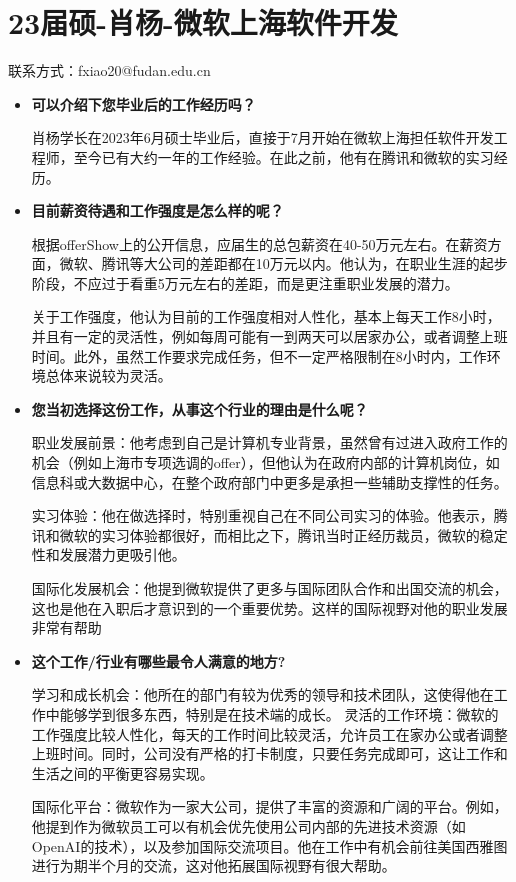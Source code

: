 \newpage
\section{23届硕-肖杨-微软上海软件开发}
联系方式：fxiao20@fudan.edu.cn
\begin{itemize}

\setlength{\parindent}{2em} 
    \item \textbf{可以介绍下您毕业后的工作经历吗？}

肖杨学长在2023年6月硕士毕业后，直接于7月开始在微软上海担任软件开发工程师，至今已有大约一年的工作经验。在此之前，他有在腾讯和微软的实习经历。

    \item \textbf{目前薪资待遇和工作强度是怎么样的呢？}

根据offerShow上的公开信息，应届生的总包薪资在40-50万元左右。在薪资方面，微软、腾讯等大公司的差距都在10万元以内。他认为，在职业生涯的起步阶段，不应过于看重5万元左右的差距，而是更注重职业发展的潜力。

关于工作强度，他认为目前的工作强度相对人性化，基本上每天工作8小时，并且有一定的灵活性，例如每周可能有一到两天可以居家办公，或者调整上班时间。此外，虽然工作要求完成任务，但不一定严格限制在8小时内，工作环境总体来说较为灵活。

    \item \textbf{您当初选择这份工作，从事这个行业的理由是什么呢？}

职业发展前景：他考虑到自己是计算机专业背景，虽然曾有过进入政府工作的机会（例如上海市专项选调的offer），但他认为在政府内部的计算机岗位，如信息科或大数据中心，在整个政府部门中更多是承担一些辅助支撑性的任务。

实习体验：他在做选择时，特别重视自己在不同公司实习的体验。他表示，腾讯和微软的实习体验都很好，而相比之下，腾讯当时正经历裁员，微软的稳定性和发展潜力更吸引他。

国际化发展机会：他提到微软提供了更多与国际团队合作和出国交流的机会，这也是他在入职后才意识到的一个重要优势。这样的国际视野对他的职业发展非常有帮助

  
    \item \textbf{这个工作/行业有哪些最令人满意的地方?}

学习和成长机会：他所在的部门有较为优秀的领导和技术团队，这使得他在工作中能够学到很多东西，特别是在技术端的成长。
灵活的工作环境：微软的工作强度比较人性化，每天的工作时间比较灵活，允许员工在家办公或者调整上班时间。同时，公司没有严格的打卡制度，只要任务完成即可，这让工作和生活之间的平衡更容易实现。

国际化平台：微软作为一家大公司，提供了丰富的资源和广阔的平台。例如，他提到作为微软员工可以有机会优先使用公司内部的先进技术资源（如OpenAI的技术），以及参加国际交流项目。他在工作中有机会前往美国西雅图进行为期半个月的交流，这对他拓展国际视野有很大帮助。


\end{itemize}
